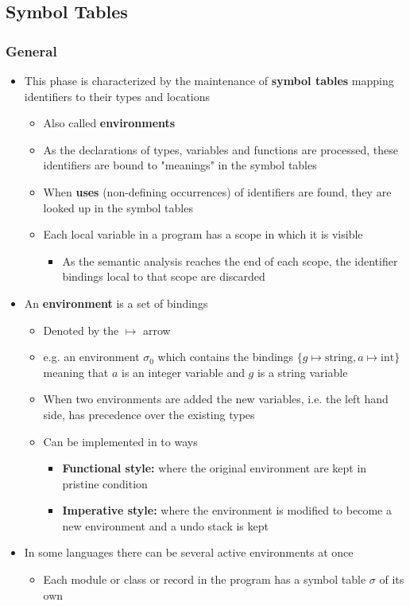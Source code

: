 \documentclass[11pt]{article}
\begin{document}
\subsection{Symbol Tables}
\label{sec:org330b9d3}
\subsubsection{General}
\label{sec:org8abf1a1}
\begin{itemize}
\item This phase is characterized by the maintenance of \textbf{symbol tables} mapping identifiers to their types and locations 
\begin{itemize}
\item Also called \textbf{environments}
\item As the declarations of types, variables and functions are processed, these identifiers are bound to "meanings" in the symbol tables
\item When \textbf{uses} (non-defining occurrences) of identifiers are found, they are looked up in the symbol tables
\item Each local variable in a program has a scope in which it is visible
\begin{itemize}
\item As the semantic analysis reaches the end of each scope, the identifier bindings local to that scope are discarded
\end{itemize}
\end{itemize}

\item An \textbf{environment} is a set of bindings
\begin{itemize}
\item Denoted by the \(\mapsto\) arrow
\item e.g. an environment \(\sigma_0\) which contains the bindings \(\{g \mapsto \text{string}, a \mapsto \text{int}\}\) meaning that \(a\) is an integer variable and \(g\) is a string variable
\item When two environments are added the new variables, i.e. the left hand side, has precedence over the existing types
\item Can be implemented in to ways
\begin{itemize}
\item \textbf{Functional style:} where the original environment are kept in pristine condition
\item \textbf{Imperative style:} where the environment is modified to become a new environment and a undo stack is kept
\end{itemize}
\end{itemize}

\item In some languages there can be several active environments at once
\begin{itemize}
\item Each module or class or record in the program has a symbol table \(\sigma\) of its own
\end{itemize}
\end{itemize}
\end{document}
